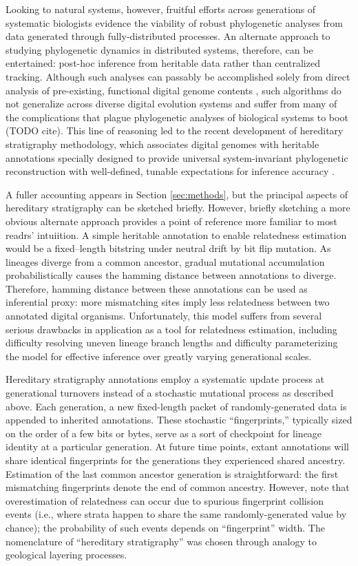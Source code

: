 Looking to  natural systems, however, fruitful efforts across generations of systematic biologists evidence the viability of robust phylogenetic analyses from data generated through fully-distributed processes.
An alternate approach to studying phylogenetic dynamics in distributed systems, therefore, can be entertained: post-hoc inference from heritable data rather than centralized tracking.
Although such analyses can passably be accomplished solely from direct analysis of pre-existing, functional digital genome contents \citep{moreno2021case}, such algorithms do not generalize across diverse digital evolution systems and suffer from many of the complications that plague phylogenetic analyses of biological systems to boot (TODO cite).
This line of reasoning led to the recent development of hereditary stratigraphy methodology, which associates digital genomes with heritable annotations specially designed to provide universal system-invariant phylogenetic reconstruction with well-defined, tunable expectations for inference accuracy
\citep{moreno2022hereditary}.


A fuller accounting appears in Section \ref{sec:methods}, but the principal aspects of hereditary stratigraphy can be sketched briefly.
However, briefly sketching a more obvious alternate approach provides a point of reference more familiar to most readrs' intuiition.
A simple heritable annotation to enable relatedness estimation would be a fixed--length bitstring under neutral drift by bit flip mutation.
As lineages diverge from a common ancestor, gradual mutational accumulation probabilistically causes the hamming distance between annotations to diverge.
Therefore, hamming distance between these annotations can be used as inferential proxy: more mismatching sites imply less relatedness between two annotated digital organisms.
Unfortunately, this model suffers from several serious drawbacks in application as a tool for relatedness estimation, including difficulty resolving uneven lineage branch lengths and difficulty parameterizing the model for effective inference over greatly varying generational scales.

Hereditary stratigraphy annotations employ a systematic update process at generational turnovers instead of a stochastic mutational process as described above.
Each generation, a new fixed-length packet of randomly-generated data is appended to inherited annotations.
These stochastic ``fingerprints,'' typically sized on the order of a few bits or bytes, serve as a sort of checkpoint for lineage identity at a particular generation.
At future time points, extant annotations will share identical fingerprints for the generations they experienced shared ancestry.
Estimation of the last common ancestor generation is straightforward: the first mismatching fingerprints denote the end of common ancestry.
However, note that overestimation of relatedness can occur due to spurious fingerprint collision events (i.e., where strata happen to share the same randomly-generated value by chance); the probability of such events depends on ``fingerprint'' width.
The nomenclature of ``hereditary stratigraphy'' was chosen through analogy to geological layering processes.

